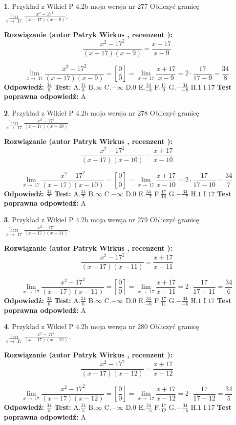 \documentclass[12pt, a4paper]{article}
\theoremstyle{definition} %
\newtheorem{zad}{}
\newcommand{\zadStart}[1]{\begin{zad}#1\newline}
\newcommand{\zadStop}{\end{zad}}
\newcommand{\rozwStart}[2]{\noindent \textbf{Rozwiązanie (autor #1 , recenzent #2): }\newline}
\newcommand{\rozwStop}{\newline}
\newcommand{\odpStart}{\noindent \textbf{Odpowiedź:}\newline}
\newcommand{\odpStop}{\newline}
\newcommand{\testStart}{\noindent \textbf{Test:}\newline}
\newcommand{\testStop}{\newline}
\newcommand{\kluczStart}{\noindent \textbf{Test poprawna odpowiedź:}\newline}
\newcommand{\kluczStop}{\newline}
\begin{document}
\zadStart{Przykład z Wikieł P 4.2b moja wersja nr 277}
Obliczyć granicę $\lim\limits_{x\to\ 17}\frac{x^{2}-17^{2}}{(x-17)(x-9)}$.
\zadStop
\rozwStart{Patryk Wirkus}{}
$$\frac{x^{2}-17^{2}}{(x-17)(x-9)}=\frac{x+17}{x-9}$$

$$\lim\limits_{x\to\ 17}\frac{x^{2}-17^{2}}{(x-17)(x-9)}=[\frac{0}{0}]=\lim\limits_{x\to\ 17}\frac{x+17}{x-9}=2 \cdot \frac{17}{17-9} = \frac{34}{8}$$
\rozwStop
\odpStart
$\frac{34}{8}$
\odpStop
\testStart
A.$\frac{34}{8}$
B.$\infty$
C.$-\infty$
D.$0$
E.$\frac{34}{-8}$
F.$\frac{17}{9}$
G.$-\frac{34}{-8}$
H.$1$
I.$17$
\testStop
\kluczStart
A
\kluczStop



\zadStart{Przykład z Wikieł P 4.2b moja wersja nr 278}
Obliczyć granicę $\lim\limits_{x\to\ 17}\frac{x^{2}-17^{2}}{(x-17)(x-10)}$.
\zadStop
\rozwStart{Patryk Wirkus}{}
$$\frac{x^{2}-17^{2}}{(x-17)(x-10)}=\frac{x+17}{x-10}$$

$$\lim\limits_{x\to\ 17}\frac{x^{2}-17^{2}}{(x-17)(x-10)}=[\frac{0}{0}]=\lim\limits_{x\to\ 17}\frac{x+17}{x-10}=2 \cdot \frac{17}{17-10} = \frac{34}{7}$$
\rozwStop
\odpStart
$\frac{34}{7}$
\odpStop
\testStart
A.$\frac{34}{7}$
B.$\infty$
C.$-\infty$
D.$0$
E.$\frac{34}{-7}$
F.$\frac{17}{10}$
G.$-\frac{34}{-7}$
H.$1$
I.$17$
\testStop
\kluczStart
A
\kluczStop



\zadStart{Przykład z Wikieł P 4.2b moja wersja nr 279}
Obliczyć granicę $\lim\limits_{x\to\ 17}\frac{x^{2}-17^{2}}{(x-17)(x-11)}$.
\zadStop
\rozwStart{Patryk Wirkus}{}
$$\frac{x^{2}-17^{2}}{(x-17)(x-11)}=\frac{x+17}{x-11}$$

$$\lim\limits_{x\to\ 17}\frac{x^{2}-17^{2}}{(x-17)(x-11)}=[\frac{0}{0}]=\lim\limits_{x\to\ 17}\frac{x+17}{x-11}=2 \cdot \frac{17}{17-11} = \frac{34}{6}$$
\rozwStop
\odpStart
$\frac{34}{6}$
\odpStop
\testStart
A.$\frac{34}{6}$
B.$\infty$
C.$-\infty$
D.$0$
E.$\frac{34}{-6}$
F.$\frac{17}{11}$
G.$-\frac{34}{-6}$
H.$1$
I.$17$
\testStop
\kluczStart
A
\kluczStop



\zadStart{Przykład z Wikieł P 4.2b moja wersja nr 280}
Obliczyć granicę $\lim\limits_{x\to\ 17}\frac{x^{2}-17^{2}}{(x-17)(x-12)}$.
\zadStop
\rozwStart{Patryk Wirkus}{}
$$\frac{x^{2}-17^{2}}{(x-17)(x-12)}=\frac{x+17}{x-12}$$

$$\lim\limits_{x\to\ 17}\frac{x^{2}-17^{2}}{(x-17)(x-12)}=[\frac{0}{0}]=\lim\limits_{x\to\ 17}\frac{x+17}{x-12}=2 \cdot \frac{17}{17-12} = \frac{34}{5}$$
\rozwStop
\odpStart
$\frac{34}{5}$
\odpStop
\testStart
A.$\frac{34}{5}$
B.$\infty$
C.$-\infty$
D.$0$
E.$\frac{34}{-5}$
F.$\frac{17}{12}$
G.$-\frac{34}{-5}$
H.$1$
I.$17$
\testStop
\kluczStart
A
\kluczStop
\end{document}
